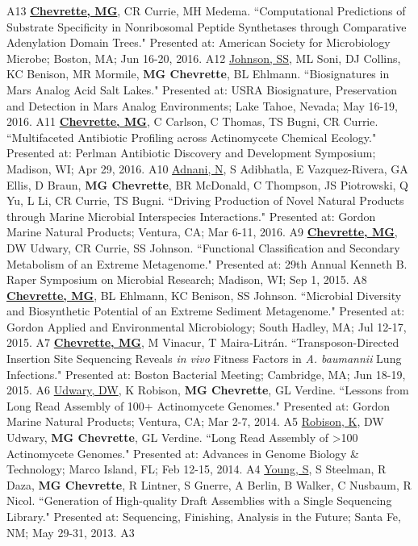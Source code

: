 \begin{cvpubs}
    {A13} %
  \cvpub
    {\textbf{\underline{Chevrette, MG}}, CR Currie, MH Medema.  ``Computational Predictions of Substrate Specificity in Nonribosomal Peptide Synthetases through Comparative Adenylation Domain Trees." Presented at: American Society for Microbiology Microbe; Boston, MA; Jun 16-20, 2016.} %
    {A12} %
  \cvpub
    {\underline{Johnson, SS}, ML Soni, DJ Collins, KC Benison, MR Mormile, \textbf{MG Chevrette}, BL Ehlmann. ``Biosignatures in Mars Analog Acid Salt Lakes." Presented at: USRA Biosignature, Preservation and Detection in Mars Analog Environments; Lake Tahoe, Nevada; May 16-19, 2016.} %
    {A11} %
  \cvpub
    {\textbf{\underline{Chevrette, MG}}, C Carlson, C Thomas, TS Bugni, CR Currie. ``Multifaceted Antibiotic Profiling across Actinomycete Chemical Ecology." Presented at: Perlman Antibiotic Discovery and Development Symposium; Madison, WI; Apr 29, 2016.} %
    {A10} %
  \cvpub
    {\underline{Adnani, N}, S Adibhatla, E Vazquez-Rivera, GA Ellis, D Braun, \textbf{MG Chevrette}, BR McDonald, C Thompson, JS Piotrowski, Q Yu, L Li, CR Currie, TS Bugni. ``Driving Production of Novel Natural Products through Marine Microbial Interspecies Interactions." Presented at: Gordon Marine Natural Products; Ventura, CA; Mar 6-11, 2016.} %
    {A9} %
  \cvpub
    {\textbf{\underline{Chevrette, MG}}, DW Udwary, CR Currie, SS Johnson. ``Functional Classification and Secondary Metabolism of an Extreme Metagenome." Presented at: 29th Annual Kenneth B. Raper Symposium on Microbial Research; Madison, WI; Sep 1, 2015.} %
    {A8} %
  \cvpub
    {\textbf{\underline{Chevrette, MG}}, BL Ehlmann, KC Benison, SS Johnson. ``Microbial Diversity and Biosynthetic Potential of an Extreme Sediment Metagenome." Presented at: Gordon Applied and Environmental Microbiology; South Hadley, MA; Jul 12-17, 2015.} %
    {A7} %
  \cvpub
    {\textbf{\underline{Chevrette, MG}}, M Vinacur, T Maira-Litr\'{a}n. ``Transposon-Directed Insertion Site Sequencing Reveals \textit{in vivo} Fitness Factors in \textit{A. baumannii} Lung Infections." Presented at: Boston Bacterial Meeting; Cambridge, MA; Jun 18-19, 2015.} %
    {A6} %
  \cvpub
    {\underline{Udwary, DW}, K Robison, \textbf{MG Chevrette}, GL Verdine. ``Lessons from Long Read Assembly of 100+ Actinomycete Genomes." Presented at: Gordon Marine Natural Products; Ventura, CA; Mar 2-7, 2014.} %
    {A5} %
  \cvpub
    {\underline{Robison, K}, DW Udwary, \textbf{MG Chevrette}, GL Verdine. ``Long Read Assembly of >100 Actinomycete Genomes." Presented at: Advances in Genome Biology \& Technology; Marco Island, FL; Feb 12-15, 2014.} %
    {A4} %
  \cvpub
    {\underline{Young, S}, S Steelman, R Daza, \textbf{MG Chevrette}, R Lintner, S Gnerre, A Berlin, B Walker, C Nusbaum, R Nicol. ``Generation of High-quality Draft Assemblies with a Single Sequencing Library." Presented at: Sequencing, Finishing, Analysis in the Future; Santa Fe, NM; May 29-31, 2013.} %
    {A3} %
\end{cvpubs}
